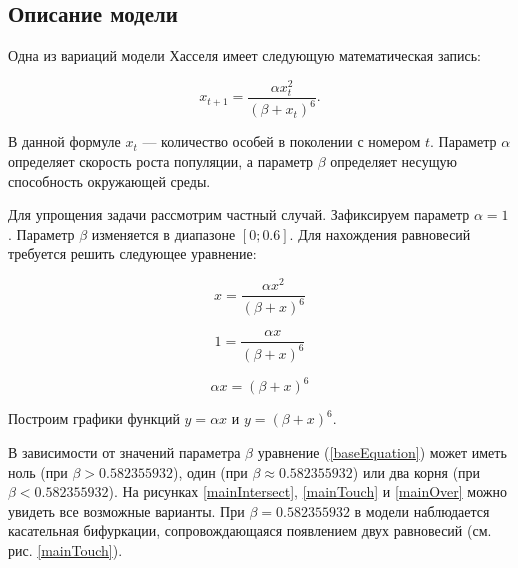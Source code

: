 \subsection{Описание модели}

    Одна из вариаций модели Хасселя \cite{densityDependenceInSingleSpeciesPopulations} имеет следующую математическая запись:

    \begin{equation}
        \label{origin}
        x_{t+1} = \frac{\alpha x_t^2}{(\beta + x_t)^6}.
    \end{equation}

    В данной формуле \(x_t\) --- количество особей в поколении с номером \(t\). Параметр \(\alpha\) определяет скорость роста популяции, а параметр \(\beta\) определяет несущую способность окружающей среды.
    
    Для упрощения задачи рассмотрим частный случай. Зафиксируем параметр \(\alpha = 1\). Параметр \(\beta\) изменяется в диапазоне \([0; 0.6]\). Для нахождения равновесий требуется решить следующее уравнение:  

    \[x = \frac{\alpha x^2}{(\beta + x)^6}\]
    
    \[1 = \frac{\alpha x}{(\beta + x)^6}\]

    \begin{equation}
        \label{baseEquation}
        \alpha x = (\beta + x)^6
    \end{equation}

    Построим графики функций \(y = \alpha x\) и \(y = (\beta + x)^6\). 
        
    В зависимости от значений параметра \(\beta\) уравнение (\ref{baseEquation}) может иметь ноль (при \(\beta > 0.582355932\)), один (при \(\beta \approx 0.582355932\)) или два корня (при \(\beta < 0.582355932\)). На рисунках \ref{mainIntersect}, \ref{mainTouch} и \ref{mainOver} можно увидеть все возможные варианты. При \(\beta=0.582355932\) в модели наблюдается касательная бифуркации, сопровождающаяся появлением двух равновесий (см. рис. \ref{mainTouch}).

